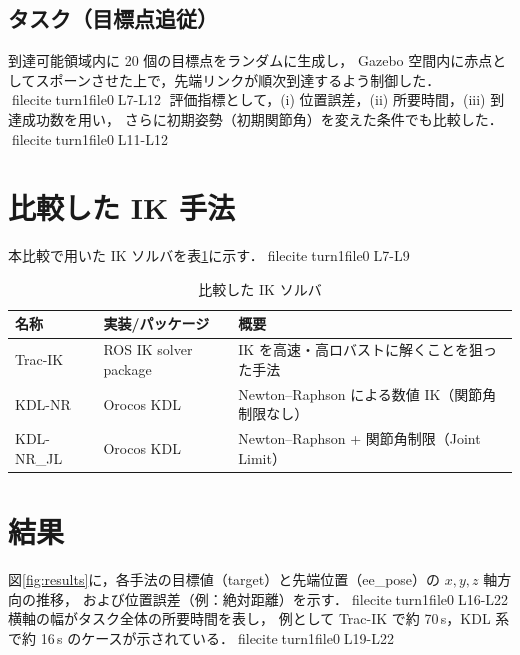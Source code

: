 \documentclass[a4paper,11pt]{ltjsarticle}
\begin{document}
\subsection{タスク（目標点追従）}
到達可能領域内に 20 個の目標点をランダムに生成し，
Gazebo 空間内に赤点としてスポーンさせた上で，先端リンクが順次到達するよう制御した．fileciteturn1file0L7-L12
評価指標として，(i) 位置誤差，(ii) 所要時間，(iii) 到達成功数を用い，
さらに初期姿勢（初期関節角）を変えた条件でも比較した．fileciteturn1file0L11-L12

\section{比較した IK 手法}
本比較で用いた IK ソルバを表\ref{tab:ik}に示す．fileciteturn1file0L7-L9

\begin{table}[h]
  \centering
  \caption{比較した IK ソルバ}
  \label{tab:ik}
  \begin{tabular}{lll}
    \toprule
    名称 & 実装/パッケージ & 概要 \\
    \midrule
    Trac-IK & ROS IK solver package & IK を高速・高ロバストに解くことを狙った手法 \\
    KDL-NR & Orocos KDL & Newton--Raphson による数値 IK（関節角制限なし）\\
    KDL-NR\_JL & Orocos KDL & Newton--Raphson + 関節角制限（Joint Limit）\\
    \bottomrule
  \end{tabular}
\end{table}

\section{結果}
図\ref{fig:results}に，各手法の目標値（target）と先端位置（ee\_pose）の $x,y,z$ 軸方向の推移，
および位置誤差（例：絶対距離）を示す．fileciteturn1file0L16-L22
横軸の幅がタスク全体の所要時間を表し，
例として Trac-IK で約 70\,s，KDL 系で約 16\,s のケースが示されている．fileciteturn1file0L19-L22
\end{document}
